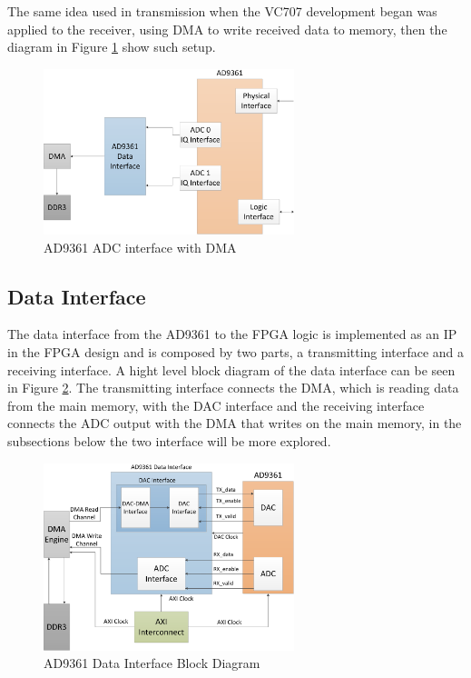 The same idea used in transmission when the VC707 development began was applied
to the receiver, using DMA to write received data to memory, then the diagram in
Figure \ref{fig:ad9361rxdma} show such setup.

\begin{figure}[htbp]
    \centering
    \includegraphics[width=0.65\textwidth]{./figures/adc_dma}
    \caption{ AD9361 ADC interface with DMA
    \label{fig:ad9361rxdma}}
\end{figure}


\subsection{Data Interface}

The data interface from the AD9361 to the FPGA logic is implemented as an IP in
the FPGA design and is composed by two parts, a transmitting interface and a
receiving interface. A hight level block diagram of the data interface can be
seen in Figure \ref{fig:databd}. The transmitting interface connects the DMA,
which is reading data from the main memory, with the DAC interface and the
receiving interface connects the ADC output with the DMA that writes on the main
memory, in the subsections below the two interface will be more explored.

\begin{figure}[htbp]
    \centering
    \includegraphics[width=0.65\textwidth]{./figures/data_if}
    \caption{ AD9361 Data Interface Block Diagram
    \label{fig:databd}}
\end{figure}

